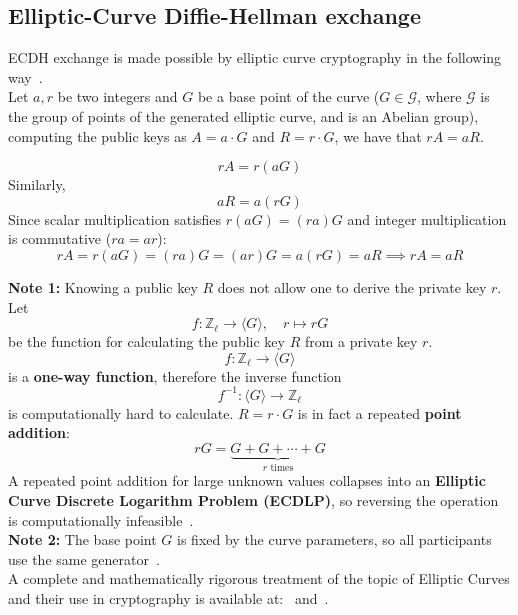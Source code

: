 \documentclass[conference]{IEEEtran}
\begin{document}
\subsection{Elliptic-Curve Diffie-Hellman exchange}\label{app:ecdh}
ECDH exchange is made possible by elliptic curve cryptography in the following way~\cite{ecdh_cryptography_book}.\\
Let $a, r$ be two integers and $G$ be a base point of the curve ($G \in \mathcal{G}$, where $\mathcal{G}$ is the group of points of the generated elliptic curve, and is an Abelian group), computing the public keys as $A = a \cdot G$ and $R = r \cdot G$, we have that $rA = aR$.
\begin{IEEEproof}
\[
rA = r(aG)
\]
Similarly,
\[
aR = a(rG)
\]
Since scalar multiplication satisfies $r(aG)=(ra)G$ and integer multiplication is commutative ($ra=ar$):
\[
rA = r(aG) = (ra)G = (ar)G = a(rG) = aR \implies rA = aR
\]
\end{IEEEproof}
\medskip
\textbf{Note 1:} Knowing a public key $R$ does not allow one to derive the private key $r$.\\
Let
\[
f:\mathbb{Z}_\ell \to \langle G\rangle,\quad r \mapsto rG
\]
be the function for calculating the public key $R$ from a private key $r$.
\[
f:\mathbb{Z}_\ell \to \langle G\rangle
\]
is a \textbf{one-way function}, therefore the inverse function
\[
f^{-1} : \langle G\rangle \to \mathbb{Z}_\ell
\]
is computationally hard to calculate. $R = r \cdot G$ is in fact a repeated \textbf{point addition}:
\[
rG = \underbrace{G + G + \cdots + G}_{r\text{ times}}
\]
A repeated point addition for large unknown values collapses into an \textbf{Elliptic Curve Discrete Logarithm Problem (ECDLP)}, so reversing the operation is computationally infeasible~\cite{ecdlp}.\\

\textbf{Note 2:} The base point $G$ is fixed by the curve parameters, so all participants use the same generator~\cite{monero_ed25519}.\\

A complete and mathematically rigorous treatment of the topic of Elliptic Curves and their use in cryptography is available at:~\cite{elliptic_curves_nist} and~\cite{elliptic_curves_wolfram}.





\end{document}
